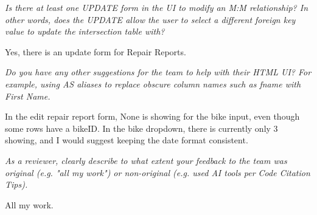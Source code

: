 \documentclass{article}
\begin{document}
\begin{tcolorbox}[colback=secondarycolor, colframe=primarycolor, title=\textbf{Step 3: Peer Review 3 - Fidella Wu}]
\vspace{0.2cm}
\textit{Is there at least one UPDATE form in the UI to modify an M:M relationship? In other words, does the UPDATE allow the user to select a different foreign key value to update the intersection table with?}

\vspace{0.05cm}
Yes, there is an update form for Repair Reports.

\vspace{0.2cm}
\textit{Do you have any other suggestions for the team to help with their HTML UI? For example, using AS aliases to replace obscure column names such as fname with First Name.}

\vspace{0.05cm}
In the edit repair report form, None is showing for the bike input, even though some rows have a bikeID. In the bike dropdown, there is currently only 3 showing, and I would suggest keeping the date format consistent.

\vspace{0.2cm}
\textit{As a reviewer, clearly describe to what extent your feedback to the team was original (e.g. "all my work") or non-original (e.g. used AI tools per Code Citation Tips). }

\vspace{0.05cm}
All my work.

\end{tcolorbox}
\end{document}
